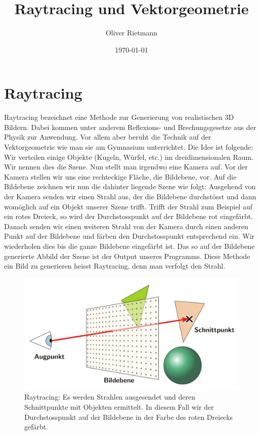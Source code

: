 \documentclass[12pt,a4paper]{article}
\title{Raytracing und Vektorgeometrie}
\author{Oliver Rietmann}
\date{\today}
\theoremstyle{definition}
\theoremstyle{definition}
\begin{document}
\maketitle
\tableofcontents
\section{Raytracing}
Raytracing bezeichnet eine Methode zur Generierung von realistischen 3D Bildern.
Dabei kommen unter anderem Reflexions- und Brechungsgesetze aus der Physik zur Anwendung.
Vor allem aber beruht die Technik auf der Vektorgeometrie wie man sie am Gymnasium unterrichtet.
Die Idee ist folgende: Wir verteilen einige Objekte (Kugeln, Würfel, etc.) im dreidimensionalen Raum.
Wir nennen dies die Szene.
Nun stellt man irgendwo eine Kamera auf.
Vor der Kamera stellen wir uns eine rechteckige Fläche, die Bildebene, vor.
Auf die Bildebene zeichnen wir nun die dahinter liegende Szene wie folgt:
Ausgehend von der Kamera senden wir einen Strahl aus, der die Bildebene durchstösst und dann womöglich auf ein Objekt unserer Szene trifft.
Trifft der Strahl zum Beispiel auf ein rotes Dreieck, so wird der Durchstosspunkt auf der Bildebene rot eingefärbt.
Danach senden wir einen weiteren Strahl von der Kamera durch einen anderen Punkt auf der Bildebene und färben den Durchstosspunkt entsprechend ein.
Wir wiederholen dies bis die ganze Bildebene eingefärbt ist.
Das so auf der Bildebene generierte Abbild der Szene ist der Output unseres Programms.
Diese Methode ein Bild zu generieren heisst Raytracing, denn man verfolgt den Strahl.
\begin{figure}[h!]
	\centering
	\includegraphics[width=\textwidth]{images/raytracing.png}
	\caption{Raytracing: Es werden Strahlen ausgesendet und deren Schnittpunkte mit Objekten ermittelt. In diesem Fall wir der Durchstosspunkt auf der Bildebene in der Farbe des roten Dreiecks gefärbt.}
	\label{fig:raytracing}
\end{figure}
\end{document}
